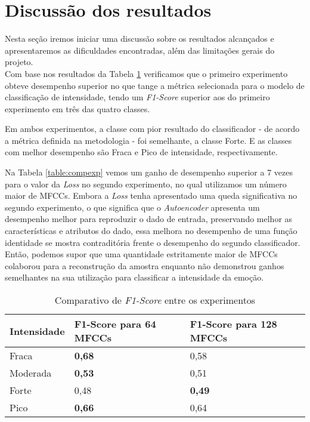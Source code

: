 


\clearpage

\section{Discussão dos resultados}

Nesta seção iremos iniciar uma discussão sobre os resultados alcançados e apresentaremos as dificuldades encontradas, além das limitações gerais do projeto.\\

Com base nos resultados da Tabela \ref{table:resultexp} verificamos que o primeiro experimento obteve desempenho superior no que tange a métrica selecionada para o modelo de classificação de intensidade, tendo um \textit{F1-Score} superior aos do primeiro experimento em três das quatro classes.

Em ambos experimentos, a classe com pior resultado do classificador - de acordo a métrica definida na metodologia - foi semelhante, a classe Forte. E as classes com melhor desempenho são Fraca e Pico de intensidade, respectivamente.

Na Tabela \ref{table:compexp} vemos um ganho de desempenho superior a 7 vezes para o valor da \textit{Loss} no segundo experimento, no qual utilizamos um número maior de \acrshort{MFCC}s. Embora a \textit{Loss} tenha apresentado uma queda significativa no segundo experimento, o que significa que o \textit{Autoencoder} apresenta um desempenho melhor para reproduzir o dado de entrada, preservando melhor as características e atributos do dado, essa melhora no desempenho de uma função identidade se mostra contraditória frente o desempenho do segundo classificador. Então, podemos supor que uma quantidade estritamente maior de \acrshort{MFCC}s colaborou para a reconstrução da amostra enquanto não demonstrou ganhos semelhantes na sua utilização para classificar a intensidade da emoção.

\begin{table}[]
    \centering
    \begin{tabular}{|l|l|l|}
    \hline
        Intensidade & F1-Score para 64 MFCCs & F1-Score para 128 MFCCs \\ \hline
        Fraca & \textbf{0,68} & 0,58 \\ \hline
        Moderada & \textbf{0,53} & 0,51 \\ \hline
        Forte & 0,48 & \textbf{0,49} \\ \hline
        Pico & \textbf{0,66} & 0,64 \\ \hline
    \end{tabular}
     \caption{\label{table:resultexp}Comparativo de \textit{F1-Score} entre os experimentos}
\end{table}

